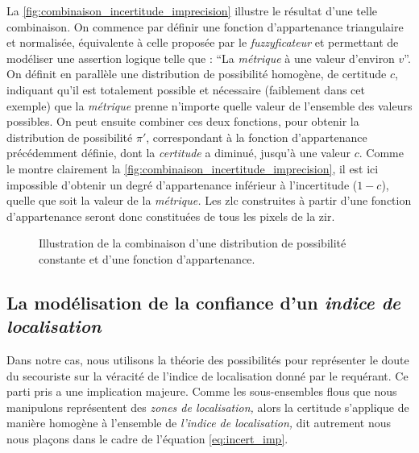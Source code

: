 La \autoref{fig:combinaison_incertitude_imprecision} illustre le
résultat d'une telle combinaison. On commence par définir une fonction
d'appartenance triangulaire et normalisée, équivalente à celle
proposée par le \emph{fuzzyficateur}  et
permettant de modéliser une assertion logique telle que : \enquote{La
  \emph{métrique} à une valeur d'environ \(v\)}. On définit en
parallèle une distribution de possibilité homogène, de certitude
\(c\), indiquant qu'il est totalement possible et nécessaire
(faiblement dans cet exemple) que la \emph{métrique} prenne n'importe
quelle valeur de l'ensemble des valeurs possibles. On peut ensuite
combiner ces deux fonctions, pour obtenir la distribution de
possibilité \(\pi'\), correspondant à la fonction d’appartenance
précédemment définie, dont la \emph{certitude} a diminué, jusqu'à une
valeur \(c\). Comme le montre clairement la
\autoref{fig:combinaison_incertitude_imprecision}, il est ici
impossible d'obtenir un degré d'appartenance inférieur à l'incertitude
(\(1-c\)), quelle que soit la valeur de la \emph{métrique.} Les
\ac{zlc} construites à partir d'une fonction d'appartenance seront
donc constituées de tous les pixels de la \ac{zir}.

\begin{figure}
  \centering
  
  \caption{Illustration de la combinaison d'une distribution de
    possibilité constante et d'une fonction d'appartenance.}
  \label{fig:combinaison_incertitude_imprecision}
\end{figure}

\subsection{La modélisation de la confiance d'un \emph{indice de
    localisation}}

Dans notre cas, nous utilisons la théorie des possibilités pour
représenter le doute du secouriste sur la véracité de l'indice de
localisation donné par le requérant. Ce parti pris a une implication
majeure. Comme les sous-ensembles flous que nous manipulons
représentent des \emph{zones de localisation,} alors la certitude
s'applique de manière homogène à l'ensemble de \emph{l'indice de
  localisation,} dit autrement nous nous plaçons dans le cadre de
l'équation \ref{eq:incert_imp}.

